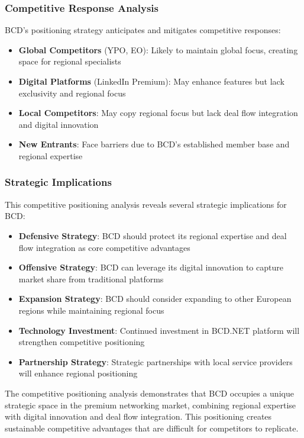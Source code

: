 \subsubsection{Competitive Response Analysis}

BCD's positioning strategy anticipates and mitigates competitive responses:

\begin{itemize}
    \item \textbf{Global Competitors} (YPO, EO): Likely to maintain global focus, creating space for regional specialists
    \item \textbf{Digital Platforms} (LinkedIn Premium): May enhance features but lack exclusivity and regional focus
    \item \textbf{Local Competitors}: May copy regional focus but lack deal flow integration and digital innovation
    \item \textbf{New Entrants}: Face barriers due to BCD's established member base and regional expertise
\end{itemize}

\subsubsection{Strategic Implications}

This competitive positioning analysis reveals several strategic implications for BCD:

\begin{itemize}
    \item \textbf{Defensive Strategy}: BCD should protect its regional expertise and deal flow integration as core competitive advantages
    \item \textbf{Offensive Strategy}: BCD can leverage its digital innovation to capture market share from traditional platforms
    \item \textbf{Expansion Strategy}: BCD should consider expanding to other European regions while maintaining regional focus
    \item \textbf{Technology Investment}: Continued investment in BCD.NET platform will strengthen competitive positioning
    \item \textbf{Partnership Strategy}: Strategic partnerships with local service providers will enhance regional positioning
\end{itemize}

The competitive positioning analysis demonstrates that BCD occupies a unique strategic space in the premium networking market, combining regional expertise with digital innovation and deal flow integration. This positioning creates sustainable competitive advantages that are difficult for competitors to replicate.

